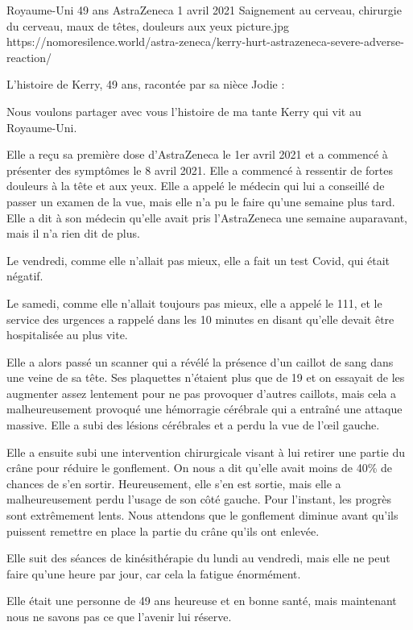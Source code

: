 {Royaume-Uni}
{49 ans}
{AstraZeneca}
{1 avril 2021}
{Saignement au cerveau, chirurgie du cerveau, maux de têtes, douleurs aux yeux}
{picture.jpg}
{https://nomoresilence.world/astra-zeneca/kerry-hurt-astrazeneca-severe-adverse-reaction/}
{

L'histoire de Kerry, 49 ans, racontée par sa nièce Jodie :

Nous voulons partager avec vous l'histoire de ma tante Kerry qui vit au
Royaume-Uni.

Elle a reçu sa première dose d'AstraZeneca le 1er avril 2021 et a commencé à
présenter des symptômes le 8 avril 2021. Elle a commencé à ressentir de fortes
douleurs à la tête et aux yeux. Elle a appelé le médecin qui lui a conseillé de
passer un examen de la vue, mais elle n'a pu le faire qu'une semaine plus
tard. Elle a dit à son médecin qu'elle avait pris l'AstraZeneca une semaine
auparavant, mais il n'a rien dit de plus.

Le vendredi, comme elle n'allait pas mieux, elle a fait un test Covid, qui était
négatif.

Le samedi, comme elle n'allait toujours pas mieux, elle a appelé le 111, et le
service des urgences a rappelé dans les 10 minutes en disant qu'elle devait être
hospitalisée au plus vite.

Elle a alors passé un scanner qui a révélé la présence d'un caillot de sang dans
une veine de sa tête. Ses plaquettes n'étaient plus que de 19 et on essayait de
les augmenter assez lentement pour ne pas provoquer d'autres caillots, mais cela
a malheureusement provoqué une hémorragie cérébrale qui a entraîné une attaque
massive. Elle a subi des lésions cérébrales et a perdu la vue de l'œil gauche.

Elle a ensuite subi une intervention chirurgicale visant à lui retirer une
partie du crâne pour réduire le gonflement. On nous a dit qu'elle avait moins de
40\% de chances de s'en sortir. Heureusement, elle s'en est sortie, mais elle a
malheureusement perdu l'usage de son côté gauche. Pour l'instant, les progrès
sont extrêmement lents. Nous attendons que le gonflement diminue avant qu'ils
puissent remettre en place la partie du crâne qu'ils ont enlevée.

Elle suit des séances de kinésithérapie du lundi au vendredi, mais elle ne peut faire qu'une heure par jour, car cela la fatigue énormément.

Elle était une personne de 49 ans heureuse et en bonne santé, mais maintenant nous ne savons pas ce que l'avenir lui réserve.

}
